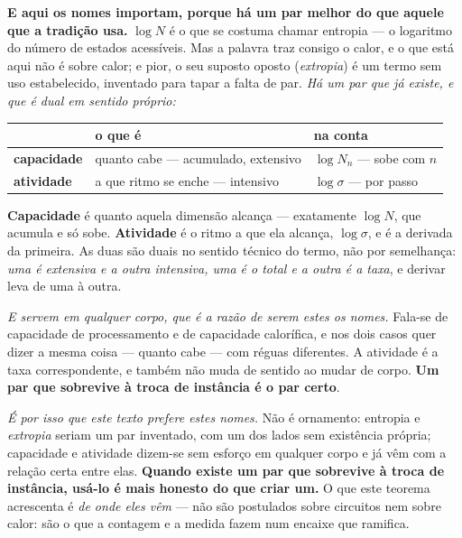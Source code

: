\documentclass[livro.tex]{subfiles}
\begin{document}
\noindent \textbf{E aqui os nomes importam, porque há um par melhor do que aquele que a
tradição usa.} $\log N$ é o que se costuma chamar entropia --- o logaritmo do número de estados
acessíveis. Mas a palavra traz consigo o calor, e o que está aqui não é sobre calor; e pior, o seu
suposto oposto (\emph{extropia}) é um termo sem uso estabelecido, inventado para tapar a falta de
par. \emph{Há um par que já existe, e que é dual em sentido próprio:}

\begin{center}\small
\begin{tabular}{@{}lll@{}}
\toprule
& \textbf{o que é} & \textbf{na conta} \\
\midrule
\textbf{capacidade} & quanto cabe --- acumulado, extensivo & $\log N_n$ --- sobe com $n$ \\
\textbf{atividade} & a que ritmo se enche --- intensivo & $\log\sigma$ --- por passo \\
\bottomrule
\end{tabular}
\end{center}

\noindent \textbf{Capacidade} é quanto aquela dimensão alcança --- exatamente $\log N$, que
acumula e só sobe. \textbf{Atividade} é o ritmo a que ela alcança, $\log\sigma$, e é a derivada da
primeira. As duas são duais no sentido técnico do termo, não por semelhança: \emph{uma é extensiva
e a outra intensiva, uma é o total e a outra é a taxa}, e derivar leva de uma à outra.

\medskip
\noindent \emph{E servem em qualquer corpo, que é a razão de serem estes os nomes.} Fala-se de
capacidade de processamento e de capacidade calorífica, e nos dois casos quer dizer a mesma coisa
--- quanto cabe --- com réguas diferentes. A atividade é a taxa correspondente, e também não muda
de sentido ao mudar de corpo. \textbf{Um par que sobrevive à troca de instância é o par certo}.

\medskip
\noindent \emph{É por isso que este texto prefere estes nomes.} Não é ornamento: entropia e
\emph{extropia} seriam um par inventado, com um dos lados sem existência própria; capacidade e
atividade dizem-se sem esforço em qualquer corpo e já vêm com a relação certa entre elas.
\textbf{Quando existe um par que sobrevive à troca de instância, usá-lo é mais honesto do que
criar um.} O que
este teorema acrescenta é \emph{de onde eles vêm} --- não são postulados sobre circuitos nem sobre
calor: são o que a contagem e a medida fazem num encaixe que ramifica.
\end{document}
